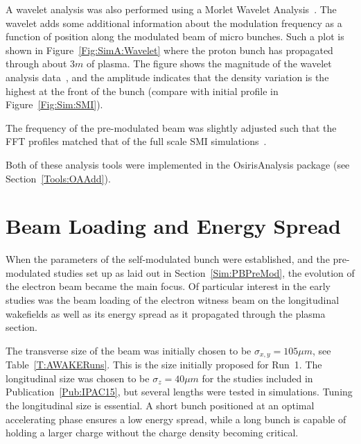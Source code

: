 A wavelet analysis was also performed using a Morlet Wavelet Analysis~\cite{goupillaud:1984,bernardino:2005}.
The wavelet adds some additional information about the modulation frequency as a function of position along the modulated beam of micro bunches.
Such a plot is shown in Figure~\ref{Fig:SimA:Wavelet} where the proton bunch has propagated through about $3\unit{m}$ of plasma.
The figure shows the magnitude of the wavelet analysis data~\cite{lee:1994}, and the amplitude indicates that the density variation is the highest at the front of the bunch (compare with initial profile in Figure~\ref{Fig:Sim:SMI}).

The frequency of the pre-modulated beam was slightly adjusted such that the FFT profiles matched that of the full scale SMI simulations~\cite{berglyd_olsen:2015}.

Both of these analysis tools were implemented in the OsirisAnalysis package (see Section~\ref{Tools:OAAdd}).

\section{Beam Loading and Energy Spread}
\label{SimA:BLoad}

When the parameters of the self-modulated bunch were established, and the pre-modulated studies set up as laid out in Section~\ref{Sim:PBPreMod}, the evolution of the electron beam became the main focus.
Of particular interest in the early studies was the beam loading of the electron witness beam on the longitudinal wakefields as well as its energy spread as it propagated through the plasma section.

The transverse size of the beam was initially chosen to be $\sigma_{x,y}=105\unit{\mu m}$, see Table~\ref{T:AWAKERuns}.
This is the size initially proposed for Run~1.
The longitudinal size was chosen to be $\sigma_{z}=40\unit{\mu m}$ for the studies included in Publication~\ref{Pub:IPAC15}, but several lengths were tested in simulations.
Tuning the longitudinal size is essential.
A short bunch positioned at an optimal accelerating phase ensures a low energy spread, while a long bunch is capable of holding a larger charge without the charge density becoming critical.

